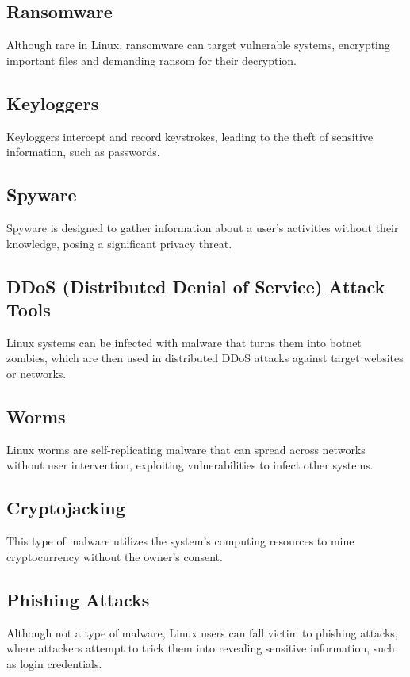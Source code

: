 \documentclass[conference]{IEEEtran}
\begin{document}
\subsection{Ransomware}
Although rare in Linux, ransomware can target vulnerable systems, encrypting important files and demanding ransom for their decryption.

\subsection{Keyloggers}
Keyloggers intercept and record keystrokes, leading to the theft of sensitive information, such as passwords.

\subsection{Spyware}
Spyware is designed to gather information about a user's activities without their knowledge, posing a significant privacy threat.

\subsection{DDoS (Distributed Denial of Service) Attack Tools}
Linux systems can be infected with malware that turns them into botnet zombies, which are then used in distributed DDoS attacks against target websites or networks.

\subsection{Worms}
Linux worms are self-replicating malware that can spread across networks without user intervention, exploiting vulnerabilities to infect other systems.

\subsection{Cryptojacking}
This type of malware utilizes the system’s computing resources to mine cryptocurrency without the owner's consent.

\subsection{Phishing Attacks}
Although not a type of malware, Linux users can fall victim to phishing attacks, where attackers attempt to trick them into revealing sensitive information, such as login credentials.
\end{document}
